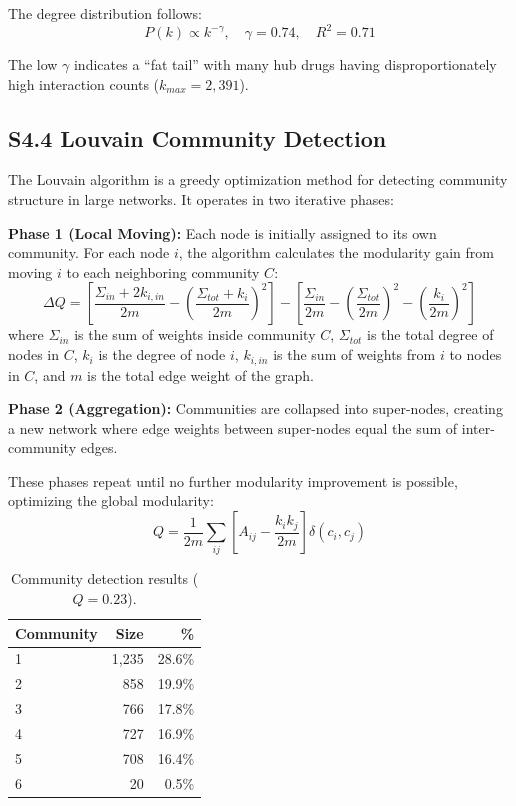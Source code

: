 \documentclass[11pt,a4paper]{article}
\begin{document}
The degree distribution follows:
\[
P(k) \propto k^{-\gamma}, \quad \gamma = 0.74, \quad R^2 = 0.71
\]

The low $\gamma$ indicates a ``fat tail'' with many hub drugs having disproportionately high interaction counts ($k_{max} = 2{,}391$).

\subsection{S4.4 Louvain Community Detection}

The Louvain algorithm is a greedy optimization method for detecting community structure in large networks. It operates in two iterative phases:

\textbf{Phase 1 (Local Moving):} Each node is initially assigned to its own community. For each node $i$, the algorithm calculates the modularity gain from moving $i$ to each neighboring community $C$:
\[
\Delta Q = \left[ \frac{\Sigma_{in} + 2k_{i,in}}{2m} - \left( \frac{\Sigma_{tot} + k_i}{2m} \right)^2 \right] - \left[ \frac{\Sigma_{in}}{2m} - \left( \frac{\Sigma_{tot}}{2m} \right)^2 - \left( \frac{k_i}{2m} \right)^2 \right]
\]
where $\Sigma_{in}$ is the sum of weights inside community $C$, $\Sigma_{tot}$ is the total degree of nodes in $C$, $k_i$ is the degree of node $i$, $k_{i,in}$ is the sum of weights from $i$ to nodes in $C$, and $m$ is the total edge weight of the graph.

\textbf{Phase 2 (Aggregation):} Communities are collapsed into super-nodes, creating a new network where edge weights between super-nodes equal the sum of inter-community edges.

These phases repeat until no further modularity improvement is possible, optimizing the global modularity:
\[
Q = \frac{1}{2m} \sum_{ij} \left[ A_{ij} - \frac{k_i k_j}{2m} \right] \delta(c_i, c_j)
\]

\begin{table}[H]
\centering
\caption{Community detection results ($Q = 0.23$).}
\begin{tabular}{@{}lrr@{}}
\toprule
\textbf{Community} & \textbf{Size} & \textbf{\%} \\
\midrule
1 & 1,235 & 28.6\% \\
2 & 858 & 19.9\% \\
3 & 766 & 17.8\% \\
4 & 727 & 16.9\% \\
5 & 708 & 16.4\% \\
6 & 20 & 0.5\% \\
\bottomrule
\end{tabular}
\end{table}
\end{document}
